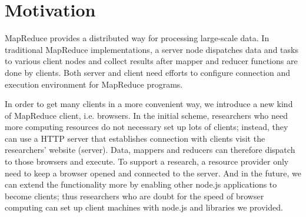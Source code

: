\section{Motivation}
\label{ch2}

MapReduce\cite{mapreduce} provides a distributed way for processing large-scale data. In traditional MapReduce implementations, a server node dispatches data and tasks to various client nodes and collect results after mapper and reducer functions are done by clients. Both server and client need efforts to configure connection and execution environment for MapReduce programs.

In order to get many clients in a more convenient way, we introduce a new kind of MapReduce client, i.e. browsers. In the initial scheme, researchers who need more computing resources do not necessary set up lots of clients; instead, they can use a HTTP server that establishes connection with clients visit the researchers’ website (server).
Data, mappers and reducers can therefore dispatch to those browsers and execute. To support a research, a resource provider only need to keep a browser opened and connected to the server.
And in the future, we can extend the functionality more by enabling other node.js\cite{nodejs} applications to become clients; thus researchers who are doubt for the speed of browser computing can set up client machines with node.js and libraries we provided.